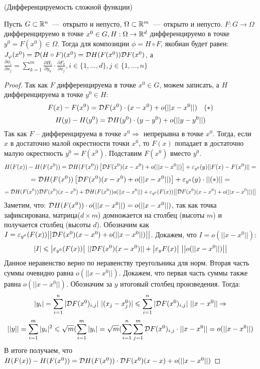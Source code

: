 \begin{theorem} \hypertarget{thrm2.1}{(Дифференцируемость сложной функции)}
    Пусть $G \subset \mathbb{R}^n$~---~открыто и непусто, $\Omega \subset \mathbb{R}^m$~---~открыто и непусто. $F: G \rightarrow \Omega$ дифференцируемо в точке $x^0 \in G, H: \Omega \rightarrow \mathbb{R}^d$ дифференцируемо в точке $y^0 = F(x^0) \in \Omega$. Тогда для композиции $\phi = H \circ F$, якобиан будет равен: $J_{\varphi}(x^0) = \mathcal{D}(H \circ F)(x^0) = \mathcal{D} H(F(x^0)) \mathcal{D} F(x^0)$, а $\frac{\partial \phi_i}{\partial x_j} = \sum \limits_{k = 1}^m \frac{\partial H_i}{\partial y_k} \cdot \frac{\partial F_k}{\partial x_j}, i \in \{1, \dots, d\}, j \in \{1, \dots, n\}$
\end{theorem}

\begin{proof}
    Так как $F$ дифференцируема в точке $x^0 \in G$, можем записать, а $H$ дифференцируема в точке $y^0 \in H$: $$ F(x) - F(x^0) = \mathcal{D} F(x^0) \cdot (x - x^0) + o(||x - x^0||)\quad(*)$$
    $$H(y) - H(y^0) = \mathcal{D} H(y^0)\cdot (y - y^0) + o(||y - y^0||)$$
    Так как $F$ -- дифференцируема в точке $x^0 \Rightarrow$ непрерывна в точке $x^0$. Тогда, если $x$ в достаточно малой окрестности точки $x^0$, то $F(x)$ попадает в достаточно малую окрестность $y^0 = F(x^0)$. Подставим $F(x^0)$ вместо $y^0$. $$H(F(x)) - H(F(x^0)) = \mathcal{D} H(F(x^0))\left[\mathcal{D} F(x^0)(x - x^0) + o(||x - x^0||)\right] + \varepsilon_{y^0}(y)|| F(x) - F(x^0)|| = $$ $$ = \mathcal{D} H(F(x^0))\left[\mathcal{D} F(x^0)(x - x^0) + o(||x - x^0||)\right] + \varepsilon_{y^0}(y)\cdot||(*)|| = $$ $$ = \mathcal{D} H(F(x^0)) \mathcal{D} F(x^0)(x - x^0) +\mathcal{D} H(F(x^0))o(||x - x^0||) + \varepsilon_{y^0}(F(x)) \big|\big| \mathcal{D} F(x^0)(x - x^0) + o(||x - x^0||)\big|\big|$$
    Заметим, что: $\mathcal{D} H(F(x^0)) \cdot o(||x - x^0||) = o(||x - x^0||)$, так как точка зафиксирована, матрица($d \times m$) домножается на столбец (высоты $m$) и получается столбец (высоты $d$). \newline 
    Обозначим как $I = \varepsilon_{y^0}(F(x))\big|\big|\mathcal{D} F(x^0)(x - x^0) + o(||x - x^0||)\big|\big|$. Докажем, что $I = o(||x - x^0||)$: $$|I| \leq \big|\epsilon_{y^0}(F(x))\big| \ ||\D F(x^0)(x - x^0)|| + \big |\epsilon_y F(x) \big| \ \big|\big|o(||x - x^0||)\big|\big| $$
    Данное неравенство верно по неравенству треугольника для норм. 
    Вторая часть суммы очевидно равна $o(||x - x^0||)$. Докажем, что первая часть суммы также равна $o(||x - x^0||)$. Обозначим за $y$ итоговый столбец произведения. Тогда: $$|y_i| = \sum\limits_{i = 1}^n |\mathcal{D} F(x^0)_{i, j}| \ |(x_j - x^0_j)| \leqslant \sum\limits_{i = 1}^n |\mathcal{D} F(x^0)_{i, j}| \ ||x - x^0|| \Rightarrow $$ $$ ||y|| = \sum\limits_{i = 1}^m |y_i|^2 \leqslant \sqrt{m} (\sum\limits_{i = 1}^m |y_i| = \sqrt{m}(\sum\limits_{i = 1}^n \sum\limits_{j = 1}^m \mathcal{D} F(x^0)_{i, j} \cdot ||x - x^0|| = o(||x - x^0||)$$
    В итоге получаем, что $H(F(x)) - H(F(x^0)) = \mathcal{D} H(F(x^0)) \cdot \mathcal{D} F(x^0)(x - x) + o(||x - x^0||)$
\end{proof}

